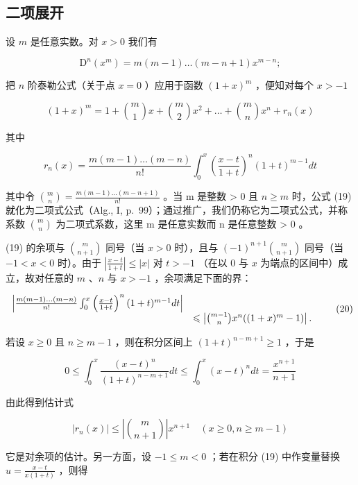 \subsection{二项展开}

设 \(m\) 是任意实数。对 \(x > 0\) 我们有

\[
\mathrm{D} ^ {n} (x ^ {m}) = m (m - 1) \dots (m - n + 1) x ^ {m - n};
\]

把 \(n\) 阶泰勒公式（关于点 \(x = 0\) ）应用于函数 \((1 + x)^m\) ，便知对每个 \(x > -1\)

\[
(1 + x) ^ {m} = 1 + \binom {m} {1} x + \binom {m} {2} x ^ {2} + \dots + \binom {m} {n} x ^ {n} + r _ {n} (x)\tag{19}
\]

其中

\[
r _ {n} (x) = \frac {m (m - 1) \dots (m - n)}{n !} \int_ {0} ^ {x} \left(\frac {x - t}{1 + t}\right) ^ {n} (1 + t) ^ {m - 1} d t
\]

其中令 \(\binom{m}{n} = \frac{m(m-1)\ldots(m-n+1)}{n!}\) 。当 m 是整数 \textgreater{} 0 且 \(n \geqslant m\) 时，公式 (19) 就化为二项式公式（Alg., I, p.~99）；通过推广，我们仍称它为二项式公式，并称系数 \(\binom{m}{n}\) 为二项式系数，这里 m 是任意实数而 n 是任意整数 \textgreater{} 0 。

(19) 的余项与 \(\binom{m}{n+1}\) 同号（当 \(x > 0\) 时），且与 \((-1)^{n+1}\binom{m}{n+1}\) 同号（当 \(-1 < x < 0\) 时）。由于 \(\left|\frac{x-t}{1+t}\right| \leqslant |x|\) 对 \(t > -1\) （在以 0 与 \(x\) 为端点的区间中）成立，故对任意的 \(m\) 、\(n\) 与 \(x > -1\) ，余项满足下面的界：

\[
\begin{array}{r l} \left| \frac {m (m - 1) \dots (m - n)}{n !} \int_ {0} ^ {x} \left(\frac {x - t}{1 + t}\right) ^ {n} (1 + t) ^ {m - 1} d t \right| & \\ & \leqslant \left| \binom {m - 1} {n} x ^ {n} ((1 + x) ^ {m} - 1) \right|. \end{array}\tag{20}
\]

若设 \(x \geqslant 0\) 且 \(n \geqslant m - 1\) ，则在积分区间上 \((1 + t)^{n - m + 1} \geqslant 1\) ，于是

\[
0 \leqslant \int_ {0} ^ {x} \frac {(x - t) ^ {n}}{(1 + t) ^ {n - m + 1}} d t \leqslant \int_ {0} ^ {x} (x - t) ^ {n} d t = \frac {x ^ {n + 1}}{n + 1}
\]

由此得到估计式

\[
\left| r _ {n} (x) \right| \leqslant \left| \binom {m} {n + 1} \right| x ^ {n + 1} \quad (x \geqslant 0, n \geqslant m - 1)\tag{21}
\]

它是对余项的估计。另一方面，设 \(-1 \leqslant m < 0\) ；若在积分 (19) 中作变量替换 \(u = \frac{x - t}{x(1 + t)}\) ，则得

